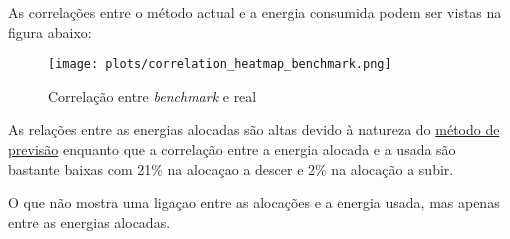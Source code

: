 As correlações entre o método actual e a energia consumida podem ser vistas na figura abaixo:\\


\begin{figure}[H]
    \centering
    \texttt{[image: plots/correlation\_heatmap\_benchmark.png]}
    \caption{Correlação entre \textit{benchmark} e real}
    \label{fig:benchmarkcorr}
\end{figure}

As relações entre as energias alocadas são altas devido à natureza do \hyperref[]{método de previsão} enquanto que a correlação entre a energia alocada e a usada são bastante baixas com 21\% na alocaçao a descer e 2\% na alocação a subir.\par
O que não mostra uma ligaçao entre as alocações e a energia usada, mas apenas entre as energias alocadas.\par

